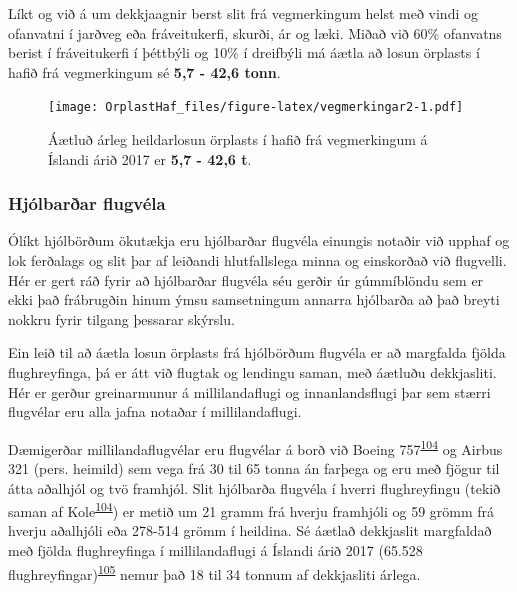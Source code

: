 \documentclass[icelandic,]{book}
\begin{document}
Líkt og við á um dekkjaagnir berst slit frá vegmerkingum helst með vindi og ofanvatni í jarðveg eða fráveitukerfi, skurði, ár og læki. Miðað við 60\% ofanvatns berist í fráveitukerfi í þéttbýli og 10\% í dreifbýli má áætla að losun örplasts í hafið frá vegmerkingum sé \textbf{5,7 - 42,6 tonn}.

\begin{figure}
\centering
\texttt{[image: OrplastHaf\_files/figure-latex/vegmerkingar2-1.pdf]}
\caption{\label{fig:vegmerkingar2}Áætluð árleg heildarlosun örplasts í hafið frá vegmerkingum á Íslandi árið 2017 er \textbf{5,7 - 42,6 t}.}
\end{figure}

\hypertarget{hjolbarar-flugvela}{%
\subsubsection*{Hjólbarðar flugvéla}\label{hjolbarar-flugvela}}

Ólíkt hjólbörðum ökutækja eru hjólbarðar flugvéla einungis notaðir við upphaf og lok ferðalags og slit þar af leiðandi hlutfallslega minna og einskorðað við flugvelli. Hér er gert ráð fyrir að hjólbarðar flugvéla séu gerðir úr gúmmíblöndu sem er ekki það frábrugðin hinum ýmsu samsetningum annarra hjólbarða að það breyti nokkru fyrir tilgang þessarar skýrslu.

Ein leið til að áætla losun örplasts frá hjólbörðum flugvéla er að margfalda fjölda flughreyfinga, þá er átt við flugtak og lendingu saman, með áætluðu dekkjasliti. Hér er gerður greinarmunur á millilandaflugi og innanlandsflugi þar sem stærri flugvélar eru alla jafna notaðar í millilandaflugi.

Dæmigerðar millilandaflugvélar eru flugvélar á borð við Boeing 757\textsuperscript{\protect\hyperlink{ref-kole2017wear}{104}} og Airbus 321 (pers. heimild) sem vega frá 30 til 65 tonna án farþega og eru með fjögur til átta aðalhjól og tvö framhjól. Slit hjólbarða flugvéla í hverri flughreyfingu (tekið saman af Kole\textsuperscript{\protect\hyperlink{ref-kole2017wear}{104}}) er metið um 21 gramm frá hverju framhjóli og 59 grömm frá hverju aðalhjóli eða 278-514 grömm í heildina. Sé áætlað dekkjaslit margfaldað með fjölda flughreyfinga í millilandaflugi á Íslandi árið 2017 (65.528 flughreyfingar)\textsuperscript{\protect\hyperlink{ref-isavia2017}{105}} nemur það 18 til 34 tonnum af dekkjasliti árlega.
\end{document}
